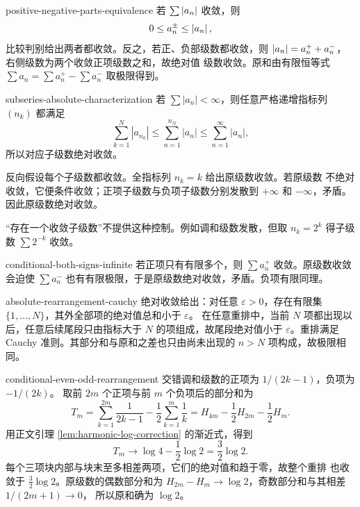 \begin{solution}{positive-negative-parts-equivalence}
若 \(\sum\left|a_n\right|\) 收敛，则
\[
 0\le a_n^\pm\le\left|a_n\right|,
\]
比较判别给出两者都收敛。反之，若正、负部级数都收敛，则
\(\left|a_n\right|=a_n^++a_n^-\)，右侧级数为两个收敛正项级数之和，故绝对值
级数收敛。原和由有限恒等式
\(\sum a_n=\sum a_n^+-\sum a_n^-\) 取极限得到。
\end{solution}

\begin{solution}{subseries-absolute-characterization}
若 \(\sum|a_n|<\infty\)，则任意严格递增指标列 \((n_k)\) 都满足
\[
 \sum_{k=1}^N|a_{n_k}|
 \le\sum_{n=1}^{n_N}|a_n|
 \le\sum_{n=1}^{\infty}|a_n|,
\]
所以对应子级数绝对收敛。

反向假设每个子级数都收敛。全指标列 \(n_k=k\) 给出原级数收敛。若原级数
不绝对收敛，它便条件收敛；正项子级数与负项子级数分别发散到
\(+\infty\) 和 \(-\infty\)，矛盾。因此原级数绝对收敛。

“存在一个收敛子级数”不提供这种控制。例如调和级数发散，但取
\(n_k=2^k\) 得子级数 \(\sum2^{-k}\) 收敛。
\end{solution}

\begin{solution}{conditional-both-signs-infinite}
若正项只有有限多个，则 \(\sum a_n^+\) 收敛。原级数收敛会迫使
\(\sum a_n^-\) 也有有限极限，于是原级数绝对收敛，矛盾。负项有限同理。
\end{solution}

\begin{solution}{absolute-rearrangement-cauchy}
绝对收敛给出：对任意 \(\varepsilon>0\)，存在有限集
\(\{1,\ldots,N\}\)，其外全部项的绝对值总和小于 \(\varepsilon\)。
在任意重排中，当前 \(N\) 项都出现以后，任意后续尾段只由指标大于
\(N\) 的项组成，故尾段绝对值小于 \(\varepsilon\)。重排满足 Cauchy
准则。其部分和与原和之差也只由尚未出现的 \(n>N\) 项构成，故极限相同。
\end{solution}

\begin{solution}{conditional-even-odd-rearrangement}
交错调和级数的正项为 \(1/(2k-1)\)，负项为 \(-1/(2k)\)。
取前 \(2m\) 个正项与前 \(m\) 个负项后的部分和为
\[
 T_m=\sum_{k=1}^{2m}\frac1{2k-1}
      -\frac12\sum_{k=1}^{m}\frac1k
 =H_{4m}-\frac12H_{2m}-\frac12H_m.
\]
用正文引理 \ref{lem:harmonic-log-correction} 的渐近式，得到
\[
 T_m\to\log4-\frac12\log2=\frac32\log2.
\]
每个三项块内部与块末至多相差两项，它们的绝对值和趋于零，故整个重排
也收敛于 \(\frac32\log2\)。原级数的偶数部分和为
\(H_{2m}-H_m\to\log2\)，奇数部分和与其相差 \(1/(2m+1)\to0\)，
所以原和确为 \(\log2\)。
\end{solution}

